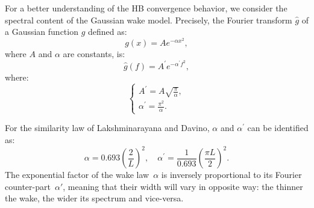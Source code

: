 For a better understanding of the HB convergence behavior, 
we consider the spectral content of the Gaussian wake model. 
Precisely, the Fourier transform $\widehat{g}$ of a Gaussian function $g$
defined as:
\begin{equation}
    g(x) = A e^{-\alpha x^2},
    \label{eq:simple_gaussian_function}
\end{equation}
where $A$ and $\alpha$ are constants, is:
\begin{equation}
    \widehat{g}(f) = A^\prime e^{-\alpha^\prime f^2},
    \label{eq:fourier_transform_gaussian}
\end{equation}
where:
\begin{equation}
  \begin{cases}
    A^\prime=A \sqrt{\frac{\pi}{\alpha}},\\
    \alpha^\prime = \frac{\pi^2}{\alpha}.
  \end{cases}
\end{equation}

For the similarity law of Lakshminarayana and Davino, 
$\alpha$ and $\alpha^\prime$ can be identified as:
\begin{equation}
    \alpha =  0.693 \left( \frac{2}{L} \right)^2, \quad
    \alpha^\prime =  \frac{1}{0.693} \left( \frac{\pi L}{2} \right)^2.
    \label{eq:gaussian_params_laksh}
\end{equation}
The exponential factor of the wake law~$\alpha$ is inversely
proportional to its Fourier counter-part~$\alpha'$, meaning that their
width will vary in opposite way: the thinner the wake, the wider its
spectrum and vice-versa.

